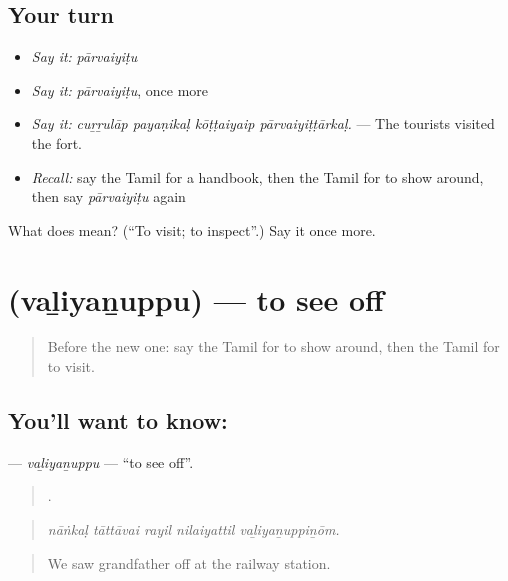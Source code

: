 \subsection*{Your turn}
\begin{itemize}
\raggedright
  \item \emph{Say it:} \emph{pārvaiyiṭu}
  \item \emph{Say it:} \emph{pārvaiyiṭu}, once more
  \item \emph{Say it:} \emph{cuṟṟulāp payaṇikaḷ kōṭṭaiyaip pārvaiyiṭṭārkaḷ.} — The tourists visited the fort.
  \item \emph{Recall:} say the Tamil for a handbook, then the Tamil for to show around, then say \emph{pārvaiyiṭu} again
\end{itemize}

\begin{tcolorbox}[breakable,colback=teal!4,colframe=teal!35!black,title={Before you move on}]
What does  mean? (\textquotedblleft{}To visit; to inspect\textquotedblright{}.) Say it once more.
\end{tcolorbox}
\section[\texorpdfstring{\ta{வழியனுப்பு} (vaḻiyaṉuppu)}{வழியனுப்பு (vaḻiyaṉuppu)}]{ (vaḻiyaṉuppu) — to see off}

\label{lesson:TA-C421-valiyanuppu}



\begin{quote}
Before the new one: say the Tamil for to show around, then the Tamil for to visit.
\end{quote}

\subsection*{You'll want to know: }
\textbf{} — \emph{vaḻiyaṉuppu} — \textquotedblleft{}to see off\textquotedblright{}.

\begin{quote}
    .
\end{quote}

\begin{quote}
\emph{nāṅkaḷ tāttāvai rayil nilaiyattil vaḻiyaṉuppiṉōm.}
\end{quote}

\begin{quote}
We saw grandfather off at the railway station.
\end{quote}


